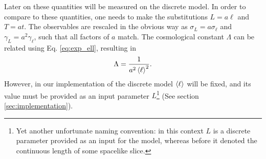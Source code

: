 Later on these quantities will be measured on the discrete model. In order to compare to these quantities, one needs to make the substitutions $L = a \ell$ and $T = a t$. The observables are rescaled in the obvious way as $\sigma_L = a \sigma_\ell$ and $\gamma_L = a^2 \gamma_\ell$, such that all factors of $a$ match. The cosmological constant $\Lambda$ can be related using Eq. \eqref{eq:exp_ell}, resulting in
\begin{equation}
    \Lambda = \frac{1}{a^2 \ev{\ell}^2}
    .
\end{equation}
However, in our implementation of the discrete model $\ev{\ell}$ will be fixed, and its value must be provided as an input parameter $L$\footnote{Yet another unfortunate naming convention: in this context $L$ is a discrete parameter provided as an input for the model, whereas before it denoted the continuous length of some spacelike slice.} (See section \ref{sec:implementation}).
